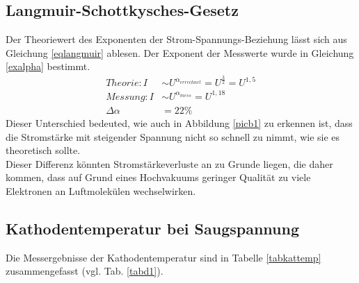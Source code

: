 \subsection{Langmuir-Schottkysches-Gesetz}
Der Theoriewert des Exponenten der Strom-Spannungs-Beziehung lässt sich aus Gleichung \ref{eqlangmuir} ablesen.
Der Exponent der Messwerte wurde in Gleichung \ref{exalpha} bestimmt.
\begin{align}
Theorie: I&\sim U^{\alpha_{errechnet}}=U^{\frac{3}{2}}=U^{1{,}5} \\
Messung: I&\sim U^{\alpha_{mess}}=U^{1{,}18} \\
\Delta \alpha &=22\%
\end{align}
Dieser Unterschied bedeuted, wie auch in Abbildung \ref{picb1} zu erkennen ist, dass die Stromstärke
mit steigender Spannung nicht so schnell zu nimmt, wie sie es theoretisch sollte. \\
Dieser Differenz könnten Stromstärkeverluste an zu Grunde liegen, die daher kommen, dass auf Grund eines
Hochvakuums geringer Qualität zu viele Elektronen an Luftmolekülen wechselwirken.
% 
\subsection{Kathodentemperatur bei Saugspannung}
Die Messergebnisse der Kathodentemperatur sind in Tabelle \ref{tabkattemp} zusammengefasst (vgl. Tab. \ref{tabd1}).

\FloatBarrier
